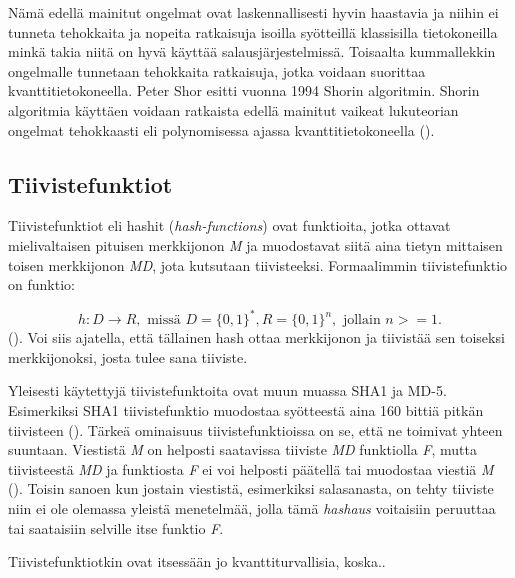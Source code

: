  Nämä edellä mainitut ongelmat ovat laskennallisesti hyvin haastavia ja niihin ei tunneta tehokkaita ja nopeita ratkaisuja isoilla syötteillä klassisilla tietokoneilla minkä takia niitä on hyvä käyttää salausjärjestelmissä. Toisaalta kummallekkin ongelmalle tunnetaan tehokkaita ratkaisuja, jotka voidaan suorittaa kvanttitietokoneella. Peter Shor esitti vuonna 1994 Shorin algoritmin. Shorin algoritmia käyttäen voidaan ratkaista edellä mainitut vaikeat lukuteorian ongelmat tehokkaasti eli polynomisessa ajassa kvanttitietokoneella (\cite{10.1007/978-3-319-11659-4_15}).
 
 \subsection{Tiivistefunktiot}
 Tiivistefunktiot eli hashit (\emph{hash-functions}) ovat funktioita, jotka ottavat mielivaltaisen pituisen merkkijonon \emph{M} ja muodostavat siitä aina tietyn mittaisen toisen merkkijonon \emph{MD}, jota kutsutaan tiivisteeksi. Formaalimmin tiivistefunktio on funktio:
 
 \[h: D \to R, \text{ missä } D = \big\{0,1\big\}^{*}, R = \big\{0,1\big\}^{n}, \text{ jollain } n >= 1.\] (\cite{sobti2012cryptographic}). Voi siis ajatella, että tällainen hash ottaa merkkijonon ja tiivistää sen toiseksi merkkijonoksi, josta tulee sana tiiviste.
 
 Yleisesti käytettyjä tiivistefunktoita ovat muun muassa SHA1 ja MD-5. Esimerkiksi SHA1 tiivistefunktio muodostaa syötteestä aina 160 bittiä pitkän tiivisteen (\cite{bellare2005introduction}). Tärkeä ominaisuus tiivistefunktioissa on se, että ne toimivat yhteen suuntaan. Viestistä \emph{M} on helposti saatavissa tiiviste \emph{MD} funktiolla \emph{F}, mutta tiivisteestä \emph{MD} ja funktiosta \emph{F} ei voi helposti päätellä tai muodostaa viestiä \emph{M} (\cite{bakhtiari1995cryptographic}). Toisin sanoen kun jostain viestistä, esimerkiksi salasanasta, on tehty tiiviste niin ei ole olemassa yleistä menetelmää, jolla tämä \emph{hashaus} voitaisiin peruuttaa tai saataisiin selville itse funktio \emph{F}.
 
 Tiivistefunktiotkin ovat itsessään jo kvanttiturvallisia, koska..
 
